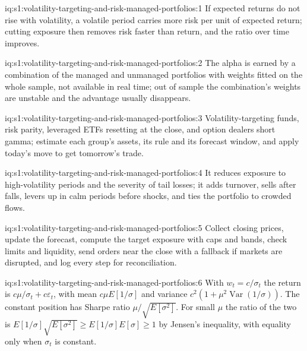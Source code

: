 \begin{solution}{iq:s1:volatility-targeting-and-risk-managed-portfolios:1}
If expected returns do not rise with volatility, a volatile period carries more risk per unit of expected return; cutting exposure then removes risk
faster than return, and the ratio over time improves.
\end{solution}

\begin{solution}{iq:s1:volatility-targeting-and-risk-managed-portfolios:2}
The alpha is earned by a combination of the managed and unmanaged portfolios with weights fitted on the whole sample, not available in real time;
out of sample the combination's weights are unstable and the advantage usually disappears.
\end{solution}

\begin{solution}{iq:s1:volatility-targeting-and-risk-managed-portfolios:3}
Volatility-targeting funds, risk parity, leveraged ETFs resetting at the close, and option dealers short gamma; estimate each group's assets, its
rule and its forecast window, and apply today's move to get tomorrow's trade.
\end{solution}

\begin{solution}{iq:s1:volatility-targeting-and-risk-managed-portfolios:4}
It reduces exposure to high-volatility periods and the severity of tail losses; it adds turnover, sells after falls, levers up in calm periods before
shocks, and ties the portfolio to crowded flows.
\end{solution}

\begin{solution}{iq:s1:volatility-targeting-and-risk-managed-portfolios:5}
Collect closing prices, update the forecast, compute the target exposure with caps and bands, check limits and liquidity, send orders near the close
with a fallback if markets are disrupted, and log every step for reconciliation.
\end{solution}

\begin{solution}{iq:s1:volatility-targeting-and-risk-managed-portfolios:6}
With $w_t = c/\sigma_t$ the return is $c\mu/\sigma_t + c\varepsilon_t$, with mean $c\mu E[1/\sigma]$ and variance $c^2(1 + \mu^2\operatorname{Var}(1/\sigma))$.
The constant position has Sharpe ratio $\mu/\sqrt{E[\sigma^2]}$. For small $\mu$ the ratio of the two is $E[1/\sigma]\sqrt{E[\sigma^2]} \ge E[1/\sigma]E[\sigma]
\ge 1$ by Jensen's inequality, with equality only when $\sigma_t$ is constant.
\end{solution}
